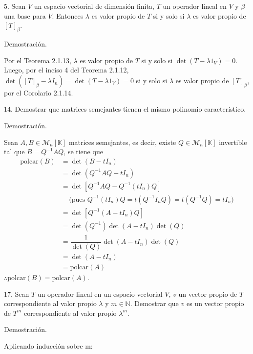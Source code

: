 \documentclass[fleqn]{article}
\begin{document}
    5. Sean $ V $ un espacio vectorial de dimensión finita, $ T $ un operador lineal en $ V $ y $ \beta $ una base para $ V $. Entonces $ \lambda $ es valor propio de $ T $ si y solo si $ \lambda $ es valor propio de $ [T]_{\beta} $.

    Demostración.

    Por el Teorema 2.1.13, $ \lambda $ es valor propio de $ T $ si y solo si $ \det(T - \lambda 1_V) = 0 $. Luego, por el inciso 4 del Teorema 2.1.12, $ \det([T]_{\beta} - \lambda I_n) = \det(T - \lambda 1_V) = 0 $ si y solo si $ \lambda $ es valor propio de $ [T]_{\beta} $, por el Corolario 2.1.14.

    14. Demostrar que matrices semejantes tienen el mismo polinomio característico.

    Demostración.

    Sean $ A, B \in \mathcal{M}_n [\mathbb{K}] $ matrices semejantes, es decir, existe $ Q \in \mathcal{M}_n [\mathbb{K}] $ invertible tal que $ B = Q^{-1} A Q $, se tiene que
    \begin{align*}
        \text{polcar}(B) &= \det(B - t I_n) \\
        &= \det(Q^{-1} A Q - t I_n) \\
        &= \det[Q^{-1} A Q - Q^{-1} (t I_n) Q] \\
        & \quad \, \bigl( \text{pues } Q^{-1} (t I_n) Q = t (Q^{-1} I_n Q) = t (Q^{-1} Q) = t I_n \bigr) \\
        &= \det[Q^{-1} (A - t I_n) Q] \\
        &= \det(Q^{-1}) \det(A - t I_n) \det(Q) \\
        &= \dfrac{1}{\det(Q)} \det(A - t I_n) \det(Q) \\
        &= \det(A - t I_n) \\
        &= \text{polcar}(A)
    \end{align*}
    $ \therefore \text{polcar}(B) = \text{polcar}(A) $.

    17. Sean $ T $ un operador lineal en un espacio vectorial $ V $, $ v $ un vector propio de $ T $ correspondiente al valor propio $ \lambda $ y $ m \in \mathbb{N} $. Demostrar que $ v $ es un vector propio de $ T^m $ correspondiente al valor propio $ \lambda^m $.

    Demostración.

    Aplicando inducción sobre m:
\end{document}
